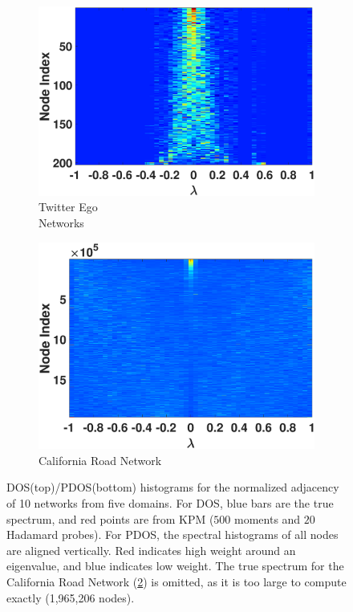 \begin{figure}[ht]
\begin{subfigure}[t]{0.19\textwidth}
    \includegraphics[width=\textwidth,trim = .4cm 0.5cm 3.5cm 1.3cm,clip]
    {./ndos/pics/twitter_ldos}
    \caption{Twitter Ego \\Networks}
    \label{fig:twitter_ldos}
  \end{subfigure}
  \begin{subfigure}[t]{0.19\textwidth}
    \centering  
    \captionsetup{justification=centering,font=scriptsize}
    \includegraphics[width=\textwidth,trim = .4cm 0.5cm 3.5cm 0.3cm,clip]
    {./ndos/pics/roadca_ldos}
    \caption{California Road Network}
    \label{fig:roadca_ldos}
  \end{subfigure}
  \caption{DOS(top)/PDOS(bottom) histograms for the normalized adjacency of 10
  networks from five domains. For DOS, blue bars are the true spectrum, and red
  points are from KPM ($500$ moments and $20$ Hadamard probes). For PDOS, the
  spectral histograms of all nodes are aligned vertically. Red indicates high
  weight around an eigenvalue, and blue indicates low weight. The true spectrum
  for the California Road Network (\ref{fig:roadca_ldos}) is omitted, as it is
  too large to compute exactly (1,965,206 nodes).}\label{fig:gallery}
\end{figure}

